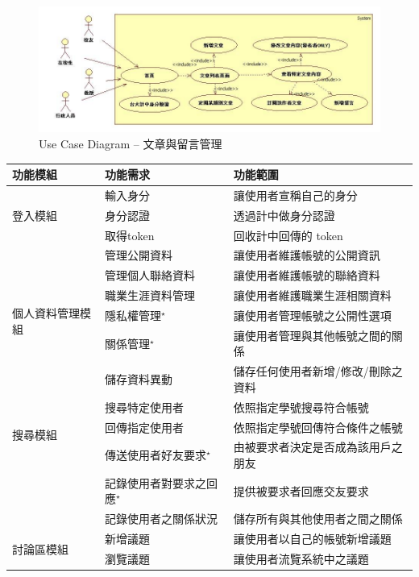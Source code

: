 \documentclass[12pt]{article}
\begin{document}
\begin{figure}[H]
\centering
\includegraphics[width=1.05\textwidth]{img/useseq/stage2/useForum.jpg}
\caption{Use Case Diagram -- 文章與留言管理}
\label{pic:use:forum}
\end{figure}


\begin{table}[t]
\centering
\begin{tabular}{ | l | l | l | }
\hline
功能模組 & 功能需求 & 功能範圍 \\ \hline \hline
\multirow{3}{*}{登入模組}
& 輸入身分 & 讓使用者宣稱自己的身分\\
& 身分認證 & 透過計中做身分認證 \\
& 取得token & 回收計中回傳的 token \\ \hline
\multirow{6}{*}{個人資料管理模組}
& 管理公開資料 & 讓使用者維護帳號的公開資訊 \\
& 管理個人聯絡資料& 讓使用者維護帳號的聯絡資料\\
& 職業生涯資料管理& 讓使用者維護職業生涯相關資料 \\
& 隱私權管理$^\star$& 讓使用者管理帳號之公開性選項 \\
& 關係管理$^\star$& 讓使用者管理與其他帳號之間的關係 \\
& 儲存資料異動& 儲存任何使用者新增/修改/刪除之資料 \\ \hline
\multirow{3}{*}{搜尋模組}
& 搜尋特定使用者 & 依照指定學號搜尋符合帳號 \\
& 回傳指定使用者 & 依照指定學號回傳符合條件之帳號 \\ \hline
 \multirow{3}{*}{關係建立模組}
& 傳送使用者好友要求$^\star$ & 由被要求者決定是否成為該用戶之朋友 \\
& 記錄使用者對要求之回應$^\star$ & 提供被要求者回應交友要求 \\
& 記錄使用者之關係狀況 & 儲存所有與其他使用者之間之關係 \\ \hline
\multirow{4}{*}{討論區模組}
& 新增議題 & 讓使用者以自己的帳號新增議題 \\
& 瀏覽議題 & 讓使用者流覽系統中之議題 \\

\end{tabular}
\end{table}
\end{document}
